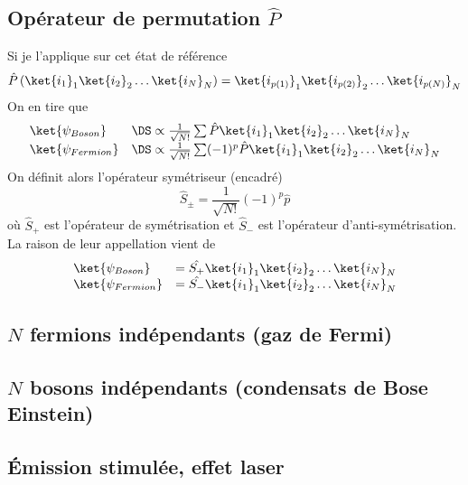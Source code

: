 \subsection{Opérateur de permutation $\hat P$}
Si je l'applique sur cet état de référence
\begin{equation}
\hat{P}\left(\ket{i_1}_1\ket{i_2}_2\dots\ket{i_N}_N\right) = \ket{i_{p(1)}}_1\ket{i_{p(2)}}_2\dots\ket{i_{p(N)}}_N
\end{equation}
On en tire que
\begin{equation}
\begin{array}{ll}
\ket{\psi_{Boson}} &\DS\propto \frac{1}{\sqrt{N!}}\sum \hat{P}\ket{i_1}_1\ket{i_2}_2\dots\ket{i_N}_N\\
\ket{\psi_{Fermion}} &\DS\propto \frac{1}{\sqrt{N!}}\sum(-1)^p \hat{P}\ket{i_1}_1\ket{i_2}_2\dots\ket{i_N}_N
\end{array}
\end{equation}
On définit alors l'opérateur symétriseur (encadré)
\begin{equation}
\hat{S}_\pm = \frac{1}{\sqrt{N!}}(-1)^p \hat{p}
\end{equation}
où $\hat{S}_+$ est l'opérateur de symétrisation et $\hat{S}_-$ est l'opérateur d'anti-symétrisation. La raison de leur 
appellation vient de
\begin{equation}
\begin{array}{ll}
\ket{\psi_{Boson}} &= \hat{S_+} \ket{i_1}_1\ket{i_2}_2\dots\ket{i_N}_N\\
\ket{\psi_{Fermion}} &= \hat{S_-} \ket{i_1}_1\ket{i_2}_2\dots\ket{i_N}_N
\end{array}
\end{equation}

















\subsection{$N$ fermions indépendants (gaz de Fermi)}
\subsection{$N$ bosons indépendants (condensats de Bose Einstein)}
\subsection{Émission stimulée, effet laser}























